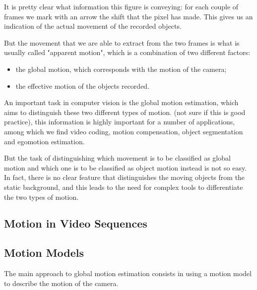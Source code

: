 It is pretty clear what information this figure is conveying: for each couple of frames we mark with an arrow the shift that the pixel has made. This gives us an indication of the actual movement of the recorded objects.

But the movement that we are able to extract from the two frames is what is usually called "apparent motion", which is a combination of two different factors:
\begin{itemize}
    \item the global motion, which corresponds with the motion of the camera;
    \item the effective motion of the objects recorded.
\end{itemize}

An important task in computer vision is the global motion estimation, which aims to distinguish these two different types of motion.
 (not sure if this is good practice), this information is highly important for a number of applications, among which we find video coding, motion compensation, object segmentation and egomotion estimation.

But the task of distinguishing which movement is to be classified as global motion and which one is to be classified as object motion instead is not so easy. In fact, there is no clear feature that distinguishes the moving objects from the static background, and this leads to the need for complex tools to differentiate the two types of motion.

\subsection{Motion in Video Sequences}


\subsection{Motion Models}
\label{sec:motion-models}

The main approach to global motion estimation consists in using a motion model to describe the motion of the camera.

